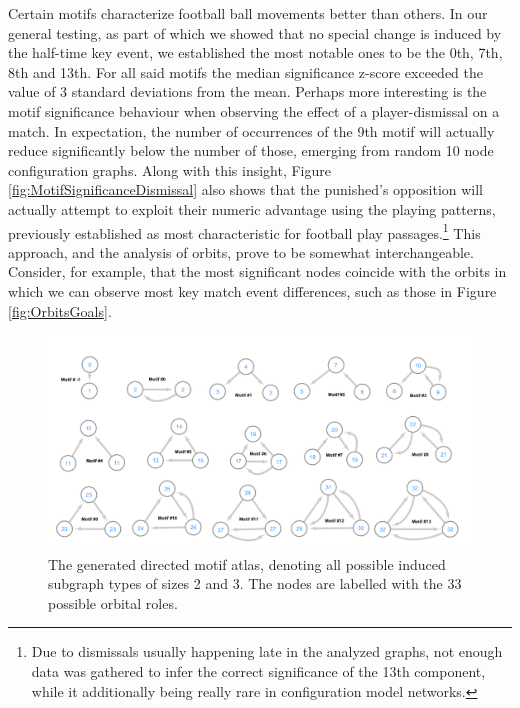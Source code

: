 \documentclass[9pt,twocolumn,twoside]{pnas-report}
\begin{document}
Certain motifs characterize football ball movements better than others. In our general testing, as part of which we showed that no special change is induced by the half-time key event, we established the most notable ones to be the 0th, 7th, 8th and 13th. For all said motifs the median significance z-score exceeded the value of 3 standard deviations from the mean. Perhaps more interesting is the motif significance behaviour when observing the effect of a player-dismissal on a match. In expectation, the number of occurrences of the 9th motif will actually reduce significantly below the number of those, emerging from random 10 node configuration graphs. Along with this insight, Figure \ref{fig:MotifSignificanceDismissal} also shows that the punished's opposition will actually attempt to exploit their numeric advantage using the playing patterns, previously established as most characteristic for football play passages.\footnote{Due to dismissals usually happening late in the analyzed graphs, not enough data was gathered to infer the correct significance of the 13th component, while it additionally being really rare in configuration model networks.} This approach, and the analysis of orbits, prove to be somewhat interchangeable. Consider, for example, that the most significant nodes coincide with the orbits in which we can observe most key match event differences, such as those in Figure \ref{fig:OrbitsGoals}.
 
\begin{figure}[t]\centering
	\includegraphics[width=\linewidth]{motifs.png}
	\caption{The generated directed motif atlas, denoting all possible induced subgraph types of sizes 2 and 3. The nodes are labelled with the 33 possible orbital roles.}
	\label{fig:motifs}
\end{figure}
\end{document}
